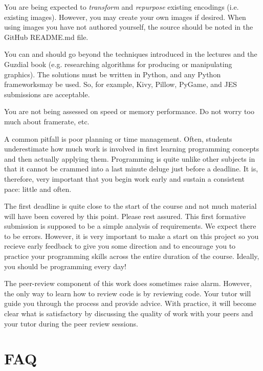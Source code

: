 \documentclass{../fal_assignment}
\begin{document}
You are being expected to \textit{transform} and \textit{repurpose} existing encodings (i.e. existing images). However, you may create your own images if desired. When using images you have not authored yourself, the source should be noted in the GitHub README.md file. 

You can and should go beyond the techniques introduced in the lectures and the Guzdial book (e.g. researching algorithms for producing or manipulating graphics). The solutions must be written in Python, and any Python frameworksmay be used. So, for example, Kivy, Pillow, PyGame, and JES submissions are acceptable.

You are not being assessed on speed or memory performance. Do not worry too much about framerate, etc.

A common pitfall is poor planning or time management. Often, students underestimate how much work is involved in first learning programming concepts and then actually applying them. Programming is quite unlike other subjects in that it cannot be crammed into a last minute deluge just before a deadline. It is, therefore, very important that you begin work early and sustain a consistent pace: little and often.

The first deadline is quite close to the start of the course and not much material will have been covered by this point. Please rest assured. This first formative submission is supposed to be a simple analysis of requirements. We expect there to be errors. However, it is very important to make a start on this project so you recieve early feedback to give you some direction and to encourage you to practice your programming skills across the entire duration of the course. Ideally, you should be programming every day!

The peer-review component of this work does sometimes raise alarm. However, the only way to learn how to review code is by reviewing code. Your tutor will guide you through the process and provide advice. With practice, it will become clear what is satisfactory by discussing the quality of work with your peers and your tutor during the peer review sessions. 

\section*{FAQ}
\end{document}
